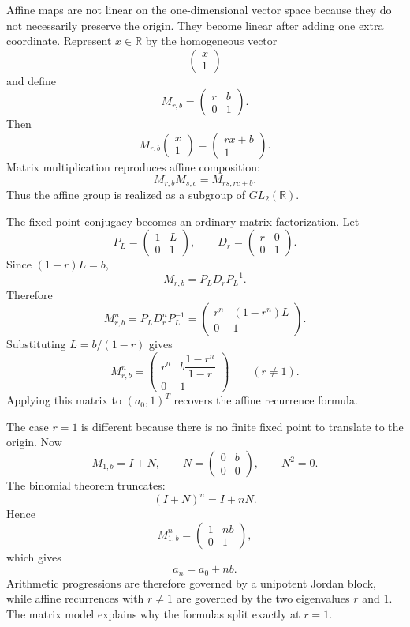 Affine maps are not linear on the one-dimensional vector space because they do not necessarily preserve the origin.  They become linear after adding one extra coordinate.  Represent \(x\in\mathbb R\) by the homogeneous vector
\[
  \begin{pmatrix}x\\1\end{pmatrix}
\]
and define
\[
  M_{r,b}=
  \begin{pmatrix}r&b\\0&1\end{pmatrix}.
\]
Then
\[
  M_{r,b}
  \begin{pmatrix}x\\1\end{pmatrix}
  =
  \begin{pmatrix}rx+b\\1\end{pmatrix}.
\]
Matrix multiplication reproduces affine composition:
\[
  M_{r,b}M_{s,c}
  =M_{rs,rc+b}.
\]
Thus the affine group is realized as a subgroup of \(GL_2(\mathbb R)\).

The fixed-point conjugacy becomes an ordinary matrix factorization.  Let
\[
  P_L=
  \begin{pmatrix}1&L\\0&1\end{pmatrix},
  \qquad
  D_r=
  \begin{pmatrix}r&0\\0&1\end{pmatrix}.
\]
Since \((1-r)L=b\),
\[
  M_{r,b}=P_LD_rP_L^{-1}.
\]
Therefore
\[
  M_{r,b}^n
  =P_LD_r^nP_L^{-1}
  =
  \begin{pmatrix}
  r^n&(1-r^n)L\\
  0&1
  \end{pmatrix}.
\]
Substituting \(L=b/(1-r)\) gives
\[
  \boxed{
  M_{r,b}^n
  =
  \begin{pmatrix}
  r^n&b\dfrac{1-r^n}{1-r}\\
  0&1
  \end{pmatrix}}
  \qquad(r\neq1).
\]
Applying this matrix to \((a_0,1)^T\) recovers the affine recurrence formula.

The case \(r=1\) is different because there is no finite fixed point to translate to the origin.  Now
\[
  M_{1,b}
  =I+N,
  \qquad
  N=
  \begin{pmatrix}0&b\\0&0\end{pmatrix},
  \qquad
  N^2=0.
\]
The binomial theorem truncates:
\[
  (I+N)^n=I+nN.
\]
Hence
\[
  M_{1,b}^n
  =
  \begin{pmatrix}1&nb\\0&1\end{pmatrix},
\]
which gives
\[
  a_n=a_0+nb.
\]
Arithmetic progressions are therefore governed by a unipotent Jordan block, while affine recurrences with \(r\neq1\) are governed by the two eigenvalues \(r\) and \(1\).  The matrix model explains why the formulas split exactly at \(r=1\).


